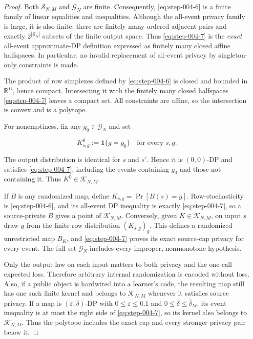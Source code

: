 \begin{proof}
Both \(\mathcal S_{N,M}\) and \(\mathcal G_N\) are finite. Consequently,
\eqref{eq:step-004-6} is a finite family of linear equalities and inequalities. Although the
all-event privacy family is large, it is also finite: there are finitely many
ordered adjacent pairs and exactly \(2^{|\mathcal G_N|}\) subsets of the
finite output space. Thus \eqref{eq:step-004-7} is the \emph{exact} all-event approximate-DP
definition expressed as finitely many closed affine halfspaces. In
particular, no invalid replacement of all-event privacy by singleton-only
constraints is made.

The product of row simplexes defined by \eqref{eq:step-004-6} is closed and bounded in
\(\mathbb R^D\), hence compact. Intersecting it with the finitely many closed
halfspaces \eqref{eq:step-004-7} leaves a compact set. All constraints are affine, so the
intersection is convex and is a polytope.

For nonemptiness, fix any \(g_0\in\mathcal G_N\) and set

\[
K^0_{s,g}:=\mathbf 1\{g=g_0\}
\quad\text{for every }s,g.
\]

The output distribution is identical for \(s\) and \(s'\). Hence it is
\((0,0)\)-DP and satisfies \eqref{eq:step-004-7}, including the events containing \(g_0\) and
those not containing it. Thus \(K^0\in\mathcal K_{N,M}\).

If \(B\) is any randomized map, define
\(K_{s,g}=\Pr[B(s)=g]\). Row-stochasticity is \eqref{eq:step-004-6}, and its all-event DP
inequality is exactly \eqref{eq:step-004-7}, so a source-private \(B\) gives a point of
\(\mathcal K_{N,M}\). Conversely, given \(K\in\mathcal K_{N,M}\), on input
\(s\) draw \(g\) from the finite row distribution \((K_{s,g})_g\). This
defines a randomized unrestricted map \(B_K\), and \eqref{eq:step-004-7} proves its exact
source-cap privacy for every event. The full set \(\mathcal G_N\) includes
every improper, nonmonotone hypothesis.

Only the output law on each input matters to both privacy and the one-call
expected loss. Therefore arbitrary internal randomization is encoded without
loss. Also, if a public object is hardwired into a learner's code, the
resulting map still has one such finite kernel and belongs to
\(\mathcal K_{N,M}\) whenever it satisfies source privacy. If a map is
\((\varepsilon,\delta)\)-DP with
\(0\le\varepsilon\le0.1\) and \(0\le\delta\le\bar\delta_M\), its event
inequality is at most the right side of \eqref{eq:step-004-7}, so its kernel also belongs to
\(\mathcal K_{N,M}\). Thus the polytope includes the exact cap and every
stronger privacy pair below it. \end{proof}

